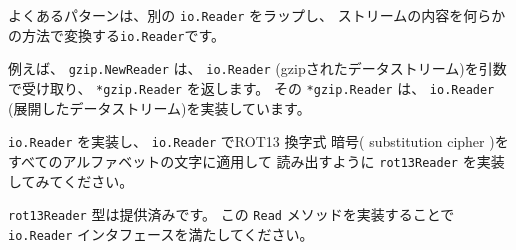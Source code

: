 よくあるパターンは、別の \texttt{io.Reader} をラップし、
ストリームの内容を何らかの方法で変換する\texttt{io.Reader}です。

例えば、 \texttt{gzip.NewReader} は、 \texttt{io.Reader}
(gzipされたデータストリーム)を引数で受け取り、 \texttt{*gzip.Reader}
を返します。 その \texttt{*gzip.Reader} は、 \texttt{io.Reader}
(展開したデータストリーム)を実装しています。

\texttt{io.Reader} を実装し、 \texttt{io.Reader} でROT13 換字式
暗号( substitution cipher )をすべてのアルファベットの文字に適用して
読み出すように \texttt{rot13Reader} を実装してみてください。

\texttt{rot13Reader} 型は提供済みです。 この \texttt{Read}
メソッドを実装することで \texttt{io.Reader} インタフェースを満たしてください。